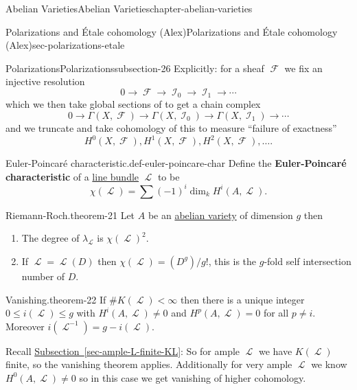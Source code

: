 \documentclass[oneside,10pt,]{book}
\newcommand{\terminology}[1]{\textbf{#1}}
\numberwithin{equation}{section}
\newcommand{\sheaf}[1]{\operatorname{\mathcal{#1}}}
\newcommand{\lt}{<}
\begin{document}
\begin{chapterptx}{Abelian Varieties}{}{Abelian Varieties}{}{}{chapter-abelian-varieties}
\begin{sectionptx}{Polarizations and Étale cohomology (Alex)}{}{Polarizations and Étale cohomology (Alex)}{}{}{sec-polarizations-etale}
\begin{subsectionptx}{Polarizations}{}{Polarizations}{}{}{subsection-26}
Explicitly: for a sheaf \(\sheaf F\) we fix an injective resolution%
\begin{equation*}
0\to \sheaf F \to \sheaf I_0 \to \sheaf I_1 \to \cdots
\end{equation*}
which we then take global sections of to get a chain complex%
\begin{equation*}
0\to \Gamma(X,\sheaf F) \to \Gamma(X,\sheaf I_0) \to \Gamma(X,\sheaf I_1) \to \cdots
\end{equation*}
and we truncate and take cohomology of this to measure ``failure of exactness''%
\begin{equation*}
H^0(X, \sheaf F) , H^1(X, \sheaf F) , H^2(X, \sheaf F) , \ldots\text{.}
\end{equation*}
%
\begin{definition}{Euler-Poincaré characteristic.}{def-euler-poincare-char}%
\hypertarget{p-254}{}%
Define the \terminology{Euler-Poincaré characteristic} of a \hyperref[def-line-bundle]{line bundle} \(\sheaf L\) to be%
\begin{equation*}
\chi(\sheaf L) = \sum (-1)^i \dim_k H^i(A,\sheaf L)\text{.}
\end{equation*}
%
\end{definition}
\begin{theorem}{Riemann-Roch.}{}{theorem-21}%
\hypertarget{p-255}{}%
Let \(A\) be an \hyperref[def-buntes-abvar]{abelian variety} of dimension \(g\) then\leavevmode%
\begin{enumerate}
\item\hypertarget{li-42}{}The degree of \(\lambda_{\sheaf L}\) is \(\chi(\sheaf L)^2\).%
\item\hypertarget{li-43}{}If \(\sheaf L = \sheaf L(D)\) then \(\chi(\sheaf L) = (D^g)/g!\), this is the \(g\)-fold self intersection number of \(D\).%
\end{enumerate}
%
\end{theorem}
\begin{theorem}{Vanishing.}{}{theorem-22}%
\hypertarget{p-256}{}%
If \(\#K( \sheaf L)\lt \infty\) then there is a unique integer \(0\le i(\sheaf L) \le g\) with \(H^i(A, \sheaf L) \ne  0\) and \(H^p(A, \sheaf L) = 0\) for all \(p \ne i\). Moreover \(i(\sheaf L^{-1}) = g - i(\sheaf L)\).%
\end{theorem}
\hypertarget{p-257}{}%
Recall \hyperref[sec-ample-L-finite-KL]{Subsection~\ref{sec-ample-L-finite-KL}}: So for ample \(\sheaf L\) we have \(K(\sheaf L)\) finite, so the vanishing theorem applies. Additionally for very ample \(\sheaf L\) we know \(H^0(A,\sheaf L) \ne 0\) so in this case we get vanishing of higher cohomology.%

\end{subsectionptx}
\end{sectionptx}
\end{chapterptx}
\end{document}
